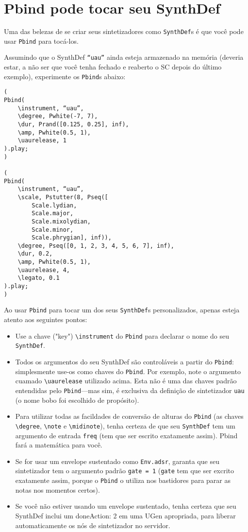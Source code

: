 \section{Pbind pode tocar seu SynthDef}

Uma das belezas de se criar seus sintetizadores como \texttt{SynthDef}s é que você pode usar \texttt{Pbind} para tocá-los.

Assumindo que o SynthDef \texttt{“uau”} ainda esteja armazenado na memória (deveria estar, a não ser que você tenha fechado e reaberto o SC depois do último exemplo), experimente os \texttt{Pbind}s abaixo:

\begin{lstlisting}[style=SuperCollider-IDE, basicstyle=\scttfamily\footnotesize]
(
Pbind(
	\instrument, “uau”,
	\degree, Pwhite(-7, 7),
	\dur, Prand([0.125, 0.25], inf),
	\amp, Pwhite(0.5, 1),
	\uaurelease, 1
).play;
)

(
Pbind(
	\instrument, “uau”,
	\scale, Pstutter(8, Pseq([
		Scale.lydian,
		Scale.major,
		Scale.mixolydian,
		Scale.minor,
		Scale.phrygian], inf)),
	\degree, Pseq([0, 1, 2, 3, 4, 5, 6, 7], inf),
	\dur, 0.2,
	\amp, Pwhite(0.5, 1),
	\uaurelease, 4,
	\legato, 0.1
).play;
)
\end{lstlisting}
 
Ao usar \texttt{Pbind} para tocar um dos seus \texttt{SynthDef}s personalizados, apenas esteja atento aos seguintes pontos:

\begin{itemize}
\item Use a chave ("key") \texttt{\textbackslash instrument} do \texttt{Pbind} para declarar o nome do seu \texttt{SynthDef}.
\item Todos os argumentos do seu SynthDef são controláveis a partir do \texttt{Pbind}: simplesmente use-os como chaves do \texttt{Pbind}. Por exemplo, note o argumento cuamado \texttt{\textbackslash uaurelease} utilizado acima. Esta não é uma das chaves padrão entendidas pelo \texttt{Pbind}---mas sim, é exclusiva da definição de sintetizador  \texttt{uau} (o nome bobo foi escolhido de propósito).

\item Para utilizar todas as facildades de conversão de alturas do \texttt{Pbind} (as chaves \texttt{\textbackslash degree}, \texttt{\textbackslash note} e \texttt{\textbackslash midinote}), tenha certeza de que seu \texttt{SynthDef} tem um argumento de entrada \texttt{freq} (tem que ser escrito exatamente assim). Pbind fará a matemática para você.
\item Se for usar um envelope sustentado como \texttt{Env.adsr}, garanta que seu sintetizador tem o argumento padrão \texttt{gate = 1} (\texttt{gate} tem que ser excrito exatamente assim, porque o \texttt{Pbind} o utiliza nos bastidores para parar as notas nos momentos certos).
\item Se você não estiver usando um envelope sustentado, tenha certeza que seu SynthDef inclui um doneAction: 2 em uma UGen apropriada, para liberar automaticamente os nós de sintetizador no servidor.
\end{itemize}

